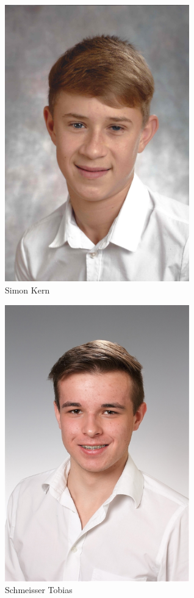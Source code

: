 \begin{minipage}{0.45\textwidth}
	\centering
	\includegraphics[width=0.6\textwidth]{figures/allgemein/portrait_Kern.jpg} 
	\medskip	
	\\Simon Kern
\end{minipage}\hfill
\begin{minipage}{0.45\textwidth}
	\centering
	\includegraphics[width=0.6\textwidth]{figures/allgemein/portrait_Schmeisser.jpg} 
	\medskip
	\\Schmeisser Tobias
\end{minipage}
\flushleft
\newpage

